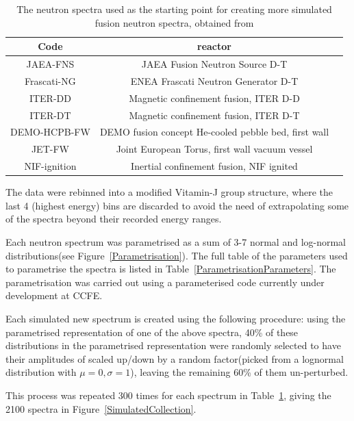 \documentclass[a4paper, 12pt]{article}
\begin{document}
\begin{table}
\begin{tabularx}{\textwidth}{ccX}
Code & reactor\\
\hline
JAEA-FNS & JAEA Fusion Neutron Source D-T\\
Frascati-NG & ENEA Frascati Neutron Generator D-T\\
ITER-DD & Magnetic confinement fusion, ITER D-D\\
ITER-DT & Magnetic confinement fusion, ITER D-T\\
DEMO-HCPB-FW & DEMO fusion concept He-cooled pebble bed, first wall\\
JET-FW & Joint European Torus, first wall vacuum vessel\\
NIF-ignition & Inertial confinement fusion, NIF ignited\\
\end{tabularx}
\caption{The neutron spectra used as the starting point for creating more simulated fusion neutron spectra, obtained from \cite{FISPACT_reference_spectra} }\label{DataAugmentationSource}
\end{table}
The data were rebinned into a modified Vitamin-J group structure, where the last 4 (highest energy) bins are discarded to avoid the need of extrapolating some of the spectra beyond their recorded energy ranges.

Each neutron spectrum was parametrised as a sum of 3-7 normal and log-normal distributions(see Figure~\ref{Parametrisation}). The full table of the parameters used to parametrise the spectra is listed in Table~\ref{ParametrisationParameters}. The parametrisation was carried out using a parameterised code currently under development at CCFE.

Each simulated new spectrum is created using the following procedure: using the parametrised representation of one of the above spectra, 40\% of these distributions in the parametrised representation were randomly selected to have their amplitudes of scaled up/down by a random factor(picked from a lognormal distribution with $\mu =0, \sigma = 1$), leaving the remaining 60\% of them un-perturbed.

This process was repeated 300 times for each spectrum in Table~\ref{DataAugmentationSource}, giving the 2100 spectra in Figure~\ref{SimulatedCollection}.
\end{document}
